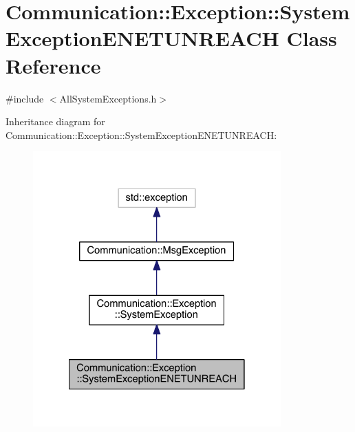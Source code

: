 \hypertarget{class_communication_1_1_exception_1_1_system_exception_e_n_e_t_u_n_r_e_a_c_h}{}\section{Communication\+:\+:Exception\+:\+:System\+Exception\+E\+N\+E\+T\+U\+N\+R\+E\+A\+C\+H Class Reference}
\label{class_communication_1_1_exception_1_1_system_exception_e_n_e_t_u_n_r_e_a_c_h}


{\ttfamily \#include $<$All\+System\+Exceptions.\+h$>$}



Inheritance diagram for Communication\+:\+:Exception\+:\+:System\+Exception\+E\+N\+E\+T\+U\+N\+R\+E\+A\+C\+H\+:\nopagebreak
\begin{figure}[H]
\begin{center}
\leavevmode
\includegraphics[width=270pt]{class_communication_1_1_exception_1_1_system_exception_e_n_e_t_u_n_r_e_a_c_h__inherit__graph}
\end{center}
\end{figure}


